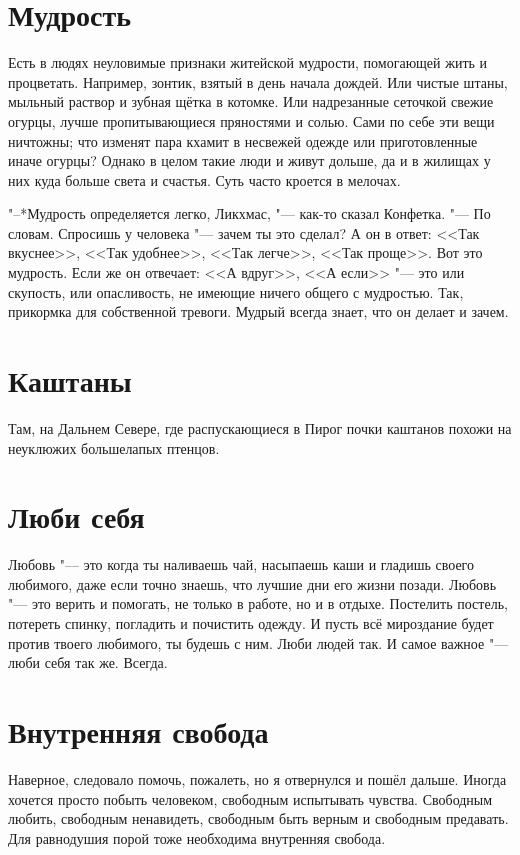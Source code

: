 \documentclass[a4paper,10pt,fleqn]{book}
\begin{document}
\section{Мудрость}

Есть в людях неуловимые признаки житейской мудрости, помогающей жить и процветать.
Например, зонтик, взятый в день начала дождей.
Или чистые штаны, мыльный раствор и зубная щётка в котомке.
Или надрезанные сеточкой свежие огурцы, лучше пропитывающиеся пряностями и солью.
Сами по себе эти вещи ничтожны;
что изменят пара кхамит в несвежей одежде или приготовленные иначе огурцы?
Однако в целом такие люди и живут дольше, да и в жилищах у них куда больше света и счастья.
Суть часто кроется в мелочах.

"--*Мудрость определяется легко, Ликхмас, "--- как-то сказал Конфетка.
"--- По словам.
Спросишь у человека "--- зачем ты это сделал?
А он в ответ: <<Так вкуснее>>, <<Так удобнее>>, <<Так легче>>, <<Так проще>>.
Вот это мудрость.
Если же он отвечает: <<А вдруг>>, <<А если>> "--- это или скупость, или опасливость, не имеющие ничего общего с мудростью.
Так, прикормка для собственной тревоги.
Мудрый всегда знает, что он делает и зачем.

\section{Каштаны}

Там, на Дальнем Севере, где распускающиеся в Пирог почки каштанов похожи на неуклюжих большелапых птенцов.

\section{Люби себя}

Любовь "--- это когда ты наливаешь чай, насыпаешь каши и гладишь своего любимого, даже если точно знаешь, что лучшие дни его жизни позади.
Любовь "--- это верить и помогать, не только в работе, но и в отдыхе.
Постелить постель, потереть спинку, погладить и почистить одежду.
И пусть всё мироздание будет против твоего любимого, ты будешь с ним.
Люби людей так.
И самое важное "--- люби себя так же.
Всегда.

\section{Внутренняя свобода}

Наверное, следовало помочь, пожалеть, но я отвернулся и пошёл дальше.
Иногда хочется просто побыть человеком, свободным испытывать чувства.
Свободным любить, свободным ненавидеть, свободным быть верным и свободным предавать.
Для равнодушия порой тоже необходима внутренняя свобода.
\end{document}
